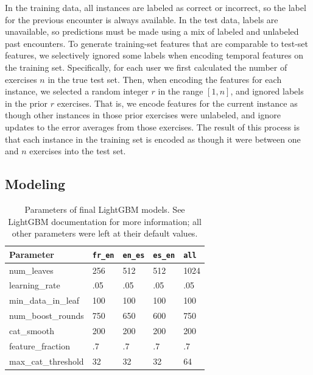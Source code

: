 \documentclass[11pt,a4paper]{article}
\begin{document}
In the training data, all instances are labeled as correct or incorrect, so the
label for the previous encounter is always available. In the test data, labels
are unavailable, so predictions must be made using a mix of labeled and
unlabeled past encounters. To generate training-set features that are 
comparable to test-set features, we selectively ignored some labels when encoding temporal features on
the training set. Specifically, for each user we first calculated the number of
exercises $n$ in the true test set. Then, when encoding the features for each
instance, we selected a random integer $r$ in the range $[1,n]$, and ignored labels
in the prior $r$ exercises. That is, we encode features for the current instance
as though other instances in those prior exercises were unlabeled, and ignore
updates to the error averages from those exercises. The result of this process
is that each instance in the training set is encoded as though it were between
one and $n$ exercises into the test set.

\subsection{Modeling}

\begin{table}[t!]
\small
\begin{center}
\begin{tabular}{|l|llll|}
  \hline \bf Parameter & {\tt fr\_en} & {\tt en\_es} & {\tt es\_en} & {\tt all} \\ \hline
  num\_leaves & 256 & 512 & 512 & 1024 \\
  learning\_rate & .05 & .05 & .05 & .05 \\
  min\_data\_in\_leaf & 100 & 100 & 100 & 100 \\
  num\_boost\_rounds & 750 & 650 & 600 & 750 \\
  cat\_smooth & 200 & 200 & 200& 200 \\
  feature\_fraction & .7 & .7 & .7 & .7 \\
  max\_cat\_threshold & 32 & 32 & 32& 64 \\
\hline
\end{tabular}
\end{center}
\caption{\label{lightgbm-params} Parameters of final LightGBM models. See
  LightGBM documentation for more information; all other parameters were left at
their default values.}
\end{table}
\end{document}
